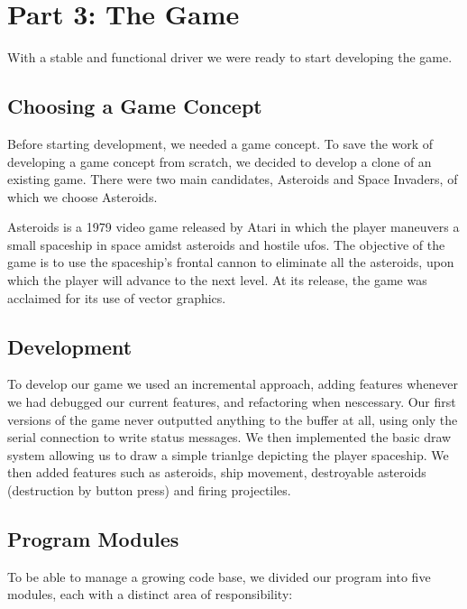 \section{Part 3: The Game}
With a stable and functional driver we were ready to start developing the game.

\subsection{Choosing a Game Concept}
Before starting development, we needed a game concept. To save the work of developing a game concept from scratch, we decided to develop a clone of an existing game. There were two main candidates, Asteroids and Space Invaders, of which we choose Asteroids.

Asteroids is a 1979 video game released by Atari in which the player maneuvers a small spaceship in space amidst asteroids and hostile ufos. The objective of the game is to use the spaceship's frontal cannon to eliminate all the asteroids, upon which the player will advance to the next level. At its release, the game was acclaimed for its use of vector graphics.


\subsection{Development}
To develop our game we used an incremental approach, adding features whenever we had debugged our current features, and refactoring when nescessary. Our first versions of the game never outputted anything to the buffer at all, using only the serial connection to write status messages. We then implemented the basic draw system allowing us to draw a simple trianlge depicting the player spaceship. We then added features such as asteroids, ship movement, destroyable asteroids (destruction by button press) and firing projectiles.

\subsection{Program Modules}
To be able to manage a growing code base, we divided our program into five modules, each with a distinct area of responsibility:

